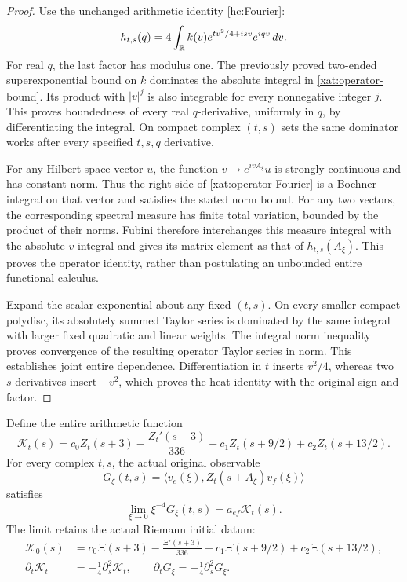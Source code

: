 \begin{proof}
Use the unchanged arithmetic identity \eqref{hc:Fourier}:
\[
h_{t,s}(q)=4\int_\mathbb R k(v)e^{tv^2/4+isv}e^{iqv}\,dv.
\]
For real \(q\), the last factor has modulus one. The previously
proved two-ended superexponential bound on \(k\) dominates the
absolute integral in \eqref{xat:operator-bound}. Its product with
\(|v|^j\) is also integrable for every nonnegative integer \(j\).
This proves boundedness of every real \(q\)-derivative, uniformly
in \(q\), by differentiating the integral. On compact complex
\((t,s)\) sets the same dominator works after every specified
\(t,s,q\) derivative.

For any Hilbert-space vector \(u\), the function
\(v\mapsto e^{ivA_\xi}u\) is strongly continuous and has constant
norm. Thus the right side of \eqref{xat:operator-Fourier} is a
Bochner integral on that vector and satisfies the stated norm bound.
For any two vectors, the corresponding spectral measure has finite
total variation, bounded by the product of their norms. Fubini
therefore interchanges this measure integral with the absolute
\(v\) integral and gives its matrix element as that of
\(h_{t,s}(A_\xi)\). This proves the operator identity, rather than
postulating an unbounded entire functional calculus.

Expand the scalar exponential about any fixed \((t,s)\). On every
smaller compact polydisc, its absolutely summed Taylor series is
dominated by the same integral with larger fixed quadratic and
linear weights. The integral norm inequality proves convergence
of the resulting operator Taylor series in norm. This establishes
joint entire dependence. Differentiation in \(t\) inserts
\(v^2/4\), whereas two \(s\) derivatives insert \(-v^2\), which
proves the heat identity with the original sign and factor.
\end{proof}

\begin{theorem}
\label{xat:arithmetic-coefficient}
Define the entire arithmetic function
\begin{equation}
\mathcal K_t(s)=c_0Z_t(s+3)-\frac{Z_t'(s+3)}{336}
                 +c_1Z_t(s+9/2)+c_2Z_t(s+13/2).
\label{xat:K}
\end{equation}
For every complex \(t,s\), the actual original observable
\begin{equation}
G_\xi(t,s)=
 \langle v_e(\xi),Z_t(s+A_\xi)v_f(\xi)\rangle
\label{xat:G}
\end{equation}
satisfies
\begin{equation}
\lim_{\xi\to0}\xi^{-4}G_\xi(t,s)=a_{ef}\mathcal K_t(s).
\label{xat:limit}
\end{equation}
The limit retains the actual Riemann initial datum:
\begin{align}
\mathcal K_0(s)&=c_0\Xi(s+3)-\frac{\Xi'(s+3)}{336}
                    +c_1\Xi(s+9/2)+c_2\Xi(s+13/2),
\label{xat:initial}\\
\partial_t\mathcal K_t&=-\tfrac14\partial_s^2\mathcal K_t,
\qquad \partial_tG_\xi=-\tfrac14\partial_s^2G_\xi.
\label{xat:heat-identities}
\end{align}
\end{theorem}

